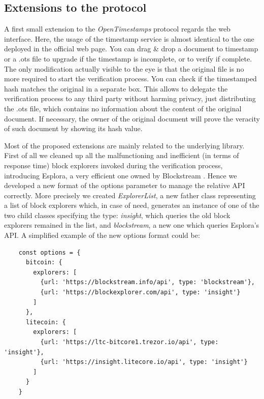 \bigskip
\subsection{Extensions to the protocol}
\label{sec:extensions}
A first small extension to the \textit{OpenTimestamps} protocol regards the web interface. Here, the usage of the timestamp service is almost identical to the one deployed in the official web page. You can drag \& drop a document to timestamp or a \colorbox{light-gray}{.ots} file to upgrade if the timestamp is incomplete, or to verify if complete. The only modification actually visible to the eye is that the original file is no more required to start the verification process. You can check if the timestamped hash matches the original in a separate box. This allows to delegate the verification process to any third party without harming privacy, just distributing the \colorbox{light-gray}{.ots} file, which contains no information about the content of the original document. If necessary, the owner of the original document will prove the veracity of such document by showing its hash value.

\bigskip
\noindent
Most of the proposed extensions are mainly related to the underlying library. First of all we cleaned up all the malfunctioning and inefficient (in terms of response time) block explorers invoked during the verification process, introducing Esplora, a very efficient one owned by Blockstream \cite{Blockstream}. Hence we developed a new format of the options parameter to manage the relative API correctly. More precisely we created \textit{ExplorerList}, a new father class representing a list of block explorers which, in case of need, generates an instance of one of the two child classes specifying the type: \textit{insight}, which queries the old block explorers remained in the list, and \textit{blockstream}, a new one which queries Esplora's API. A simplified example of the new options format could be:

\begin{lstlisting}
    const options = {
      bitcoin: {
        explorers: [
          {url: 'https://blockstream.info/api', type: 'blockstream'},
          {url: 'https://blockexplorer.com/api', type: 'insight'}
        ]
      },
      litecoin: {
        explorers: [
          {url: 'https://ltc-bitcore1.trezor.io/api', type: 'insight'},
          {url: 'https://insight.litecore.io/api', type: 'insight'}
        ]
      }
    }
\end{lstlisting}

